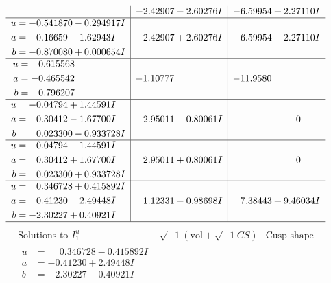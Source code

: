 \documentclass[1p]{elsarticle_modified}
\theoremstyle{definition}
\newcommand{\I}{\sqrt{-1}}
\begin{document}
$$\begin{array}{c|c|c}
 & -2.42907 - 2.60276 I & -6.59954 + 2.27110 I \\ \hline\begin{aligned}
u &= -0.541870 - 0.294917 I \\
a &= -0.16659 - 1.62943 I \\
b &= -0.870080 + 0.000654 I\end{aligned}
 & -2.42907 + 2.60276 I & -6.59954 - 2.27110 I \\ \hline\begin{aligned}
u &= \phantom{-}0.615568\phantom{ +0.000000I} \\
a &= -0.465542\phantom{ +0.000000I} \\
b &= \phantom{-}0.796207\phantom{ +0.000000I}\end{aligned}
 & -1.10777\phantom{ +0.000000I} & -11.9580\phantom{ +0.000000I} \\ \hline\begin{aligned}
u &= -0.04794 + 1.44591 I \\
a &= \phantom{-}0.30412 - 1.67700 I \\
b &= \phantom{-}0.023300 - 0.933728 I\end{aligned}
 & \phantom{-}2.95011 - 0.80061 I & \phantom{-0.000000 } 0 \\ \hline\begin{aligned}
u &= -0.04794 - 1.44591 I \\
a &= \phantom{-}0.30412 + 1.67700 I \\
b &= \phantom{-}0.023300 + 0.933728 I\end{aligned}
 & \phantom{-}2.95011 + 0.80061 I & \phantom{-0.000000 } 0 \\ \hline\begin{aligned}
u &= \phantom{-}0.346728 + 0.415892 I \\
a &= -0.41230 - 2.49448 I \\
b &= -2.30227 + 0.40921 I\end{aligned}
 & \phantom{-}1.12331 - 0.98698 I & \phantom{-}7.38443 + 9.46034 I\\
 \hline 
 \end{array}$$\newpage$$\begin{array}{c|c|c}  
\text{Solutions to }I^u_{1}& \I (\text{vol} + \sqrt{-1}CS) & \text{Cusp shape}\\
 \hline 
\begin{aligned}
u &= \phantom{-}0.346728 - 0.415892 I \\
a &= -0.41230 + 2.49448 I \\
b &= -2.30227 - 0.40921 I\end{aligned}

\end{array}$$
\end{document}
